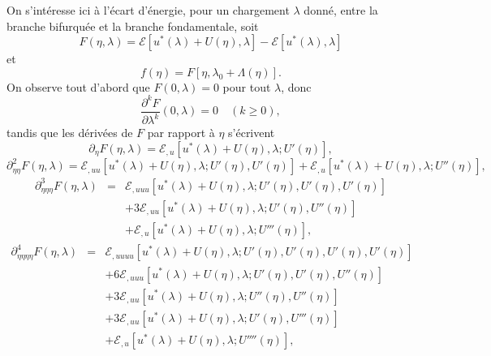 \documentclass[12pt, final]{amsart}
\begin{document}
On s'intéresse ici à l'écart d'énergie, pour un chargement
$\lambda$ donné, entre la branche bifurquée et la branche
fondamentale, soit
\begin{equation}
  F (\eta, \lambda) =\mathcal{E} [u^{\ast} (\lambda) + U (\eta), \lambda]
  -\mathcal{E} [u^{\ast} (\lambda), \lambda]
\end{equation}
et
\begin{equation}
  f (\eta) = F [\eta, \lambda_0 + \Lambda (\eta)] .
\end{equation}
On observe tout d'abord que $F (0, \lambda) = 0$ pour tout $\lambda$, donc
\begin{equation}
  \frac{\partial^k F}{\partial \lambda^k} (0, \lambda) = 0 \quad (k \geq 0),
\end{equation}
tandis que les dérivées de $F$ par rapport à $\eta$ s'écrivent
\begin{equation}
  \partial_{\eta} F (\eta, \lambda) =\mathcal{E}_{, u} [u^{\ast} (\lambda) + U
  (\eta), \lambda ; U' (\eta)],
\end{equation}
\begin{equation}
  \partial_{\eta  \eta}^2 F (\eta, \lambda) =\mathcal{E}_{, u
  u} [u^{\ast} (\lambda) + U (\eta), \lambda ; U' (\eta), U' (\eta)]
  +\mathcal{E}_{, u} [u^{\ast} (\lambda) + U (\eta), \lambda ; U'' (\eta)],
\end{equation}
\begin{eqnarray}
  \partial_{\eta  \eta  \eta}^3 F (\eta, \lambda) & = &
  \mathcal{E}_{, u  u  u} [u^{\ast} (\lambda) + U (\eta),
  \lambda ; U' (\eta), U' (\eta), U' (\eta)] \nonumber\\
  &  &  + 3\mathcal{E}_{, u  u} [u^{\ast} (\lambda) + U
  (\eta), \lambda ; U' (\eta), U'' (\eta)] \nonumber\\
  &  &  +\mathcal{E}_{, u} [u^{\ast} (\lambda) + U (\eta), \lambda ;
  U''' (\eta)],
\end{eqnarray}
\begin{eqnarray}
  \partial_{\eta  \eta  \eta  \eta}^4 F (\eta,
  \lambda) & = & \mathcal{E}_{, u  u  u  u} [u^{\ast}
  (\lambda) + U (\eta), \lambda ; U' (\eta), U' (\eta), U' (\eta), U' (\eta)]
  \nonumber\\
  &  &  + 6\mathcal{E}_{, u  u  u} [u^{\ast}
  (\lambda) + U (\eta), \lambda ; U' (\eta), U' (\eta), U'' (\eta)]
  \nonumber\\
  &  &  + 3\mathcal{E}_{, u  u} [u^{\ast} (\lambda) + U
  (\eta), \lambda ; U'' (\eta), U'' (\eta)] \nonumber\\
  &  &  + 3\mathcal{E}_{, u  u} [u^{\ast} (\lambda) + U
  (\eta), \lambda ; U' (\eta), U''' (\eta)] \nonumber\\
  &  &  +\mathcal{E}_{, u} [u^{\ast} (\lambda) + U (\eta), \lambda ;
  U'''' (\eta)],
\end{eqnarray}
\end{document}
